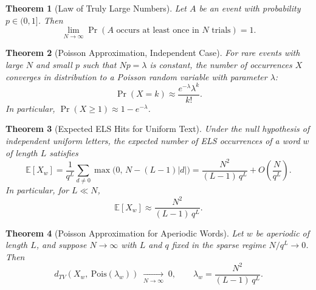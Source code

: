 \documentclass[11pt]{amsart}
\theoremstyle{plain}
\newtheorem{theorem}{Theorem}
\theoremstyle{remark}
\begin{document}
\begin{theorem}[Law of Truly Large Numbers]
\label{thm:law}
Let \(A\) be an event with probability \(p \in (0,1]\). Then
\begin{equation}
\label{eq:law-limit}
\lim_{N \to \infty} \Pr(A \text{ occurs at least once in } N \text{ trials}) = 1.
\end{equation}
\end{theorem}

\begin{theorem}[Poisson Approximation, Independent Case]
\label{thm:poisson}
For rare events with large \(N\) and small \(p\) such that \(Np = \lambda\)
is constant, the number of occurrences \(X\) converges in distribution to
a Poisson random variable with parameter \(\lambda\):
\begin{equation}
\label{eq:poisson-pmf}
\Pr(X = k) \approx \frac{e^{-\lambda} \lambda^k}{k!}.
\end{equation}
In particular, \(\Pr(X \ge 1) \approx 1 - e^{-\lambda}\).
\end{theorem}

\begin{theorem}[Expected ELS Hits for Uniform Text]
\label{thm:els}
Under the null hypothesis of independent uniform letters, the expected
number of ELS occurrences of a word \(w\) of length \(L\) satisfies
\begin{equation}
\label{eq:els-moment}
\mathbb{E}[X_w]
  = \frac{1}{q^{L}}\sum_{d \neq 0}\max\!\bigl(0,\,N-(L-1)|d|\bigr)
  = \frac{N^{2}}{(L-1)\,q^{L}} + O\!\left(\frac{N}{q^{L}}\right).
\end{equation}
In particular, for \(L \ll N\),
\begin{equation}
\label{eq:els-moment-asymp}
\mathbb{E}[X_w] \approx \frac{N^{2}}{(L-1)\,q^{L}}.
\end{equation}
\end{theorem}

\begin{theorem}[Poisson Approximation for Aperiodic Words]
\label{thm:poisson-els}
Let \(w\) be aperiodic of length \(L\), and suppose \(N \to \infty\) with
\(L\) and \(q\) fixed in the \emph{sparse regime} \(N/q^{L} \to 0\). Then
\begin{equation}
\label{eq:poisson-els}
d_{TV}\!\left(X_w,\ \mathrm{Pois}(\lambda_w)\right) \;\xrightarrow[N\to\infty]{}\; 0,
\qquad
\lambda_w = \frac{N^{2}}{(L-1)\,q^{L}}.
\end{equation}
\end{theorem}
\end{document}
